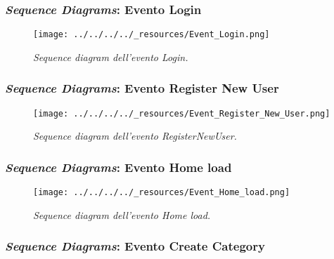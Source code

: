 \pagebreak

\hypertarget{sequence-diagrams-evento-login-1}{%
\subsubsection{\texorpdfstring{\emph{Sequence Diagrams}: Evento
Login}{Sequence Diagrams: Evento Login}}\label{sequence-diagrams-evento-login-1}}

\begin{figure}
\centering
\texttt{[image: ../../../../\_resources/Event\_Login.png]}
\caption{\emph{Sequence diagram dell'evento Login.}}
\end{figure}

\pagebreak

\hypertarget{sequence-diagrams-evento-register-new-user}{%
\subsubsection{\texorpdfstring{\emph{Sequence Diagrams}: Evento Register
New
User}{Sequence Diagrams: Evento Register New User}}\label{sequence-diagrams-evento-register-new-user}}

\begin{figure}
\centering
\texttt{[image: ../../../../\_resources/Event\_Register\_New\_User.png]}
\caption{\emph{Sequence diagram dell'evento RegisterNewUser.}}
\end{figure}

\pagebreak

\hypertarget{sequence-diagrams-evento-home-load}{%
\subsubsection{\texorpdfstring{\emph{Sequence Diagrams}: Evento Home
load}{Sequence Diagrams: Evento Home load}}\label{sequence-diagrams-evento-home-load}}

\begin{figure}
\centering
\texttt{[image: ../../../../\_resources/Event\_Home\_load.png]}
\caption{\emph{Sequence diagram dell'evento Home load.}}
\end{figure}

\pagebreak

\hypertarget{sequence-diagrams-evento-create-category}{%
\subsubsection{\texorpdfstring{\emph{Sequence Diagrams}: Evento Create
Category}{Sequence Diagrams: Evento Create Category}}\label{sequence-diagrams-evento-create-category}}

